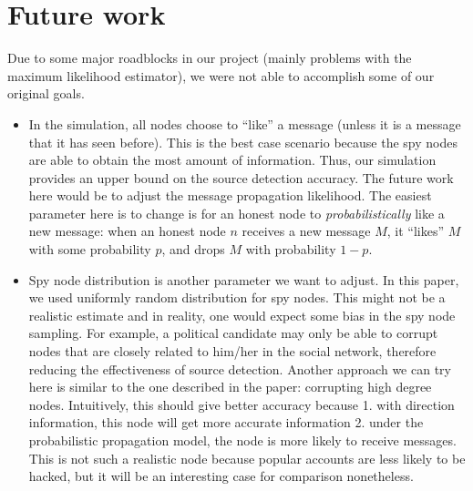 \section{Future work}

Due to some major roadblocks in our project (mainly problems with the maximum likelihood estimator), we were not able to accomplish some of our original goals. 

\begin{itemize}

\item In the simulation, all nodes choose to ``like'' a message (unless it is a message that it has seen before). This is the best case scenario because the spy nodes are able to obtain the most amount of information. Thus, our simulation provides an upper bound on the source detection accuracy. The future work here would be to adjust the message propagation likelihood. The easiest parameter here is to change is for an honest node to \emph{probabilistically} like a new message: when an honest node $n$ receives a new message $M$, it ``likes'' $M$ with some probability $p$, and drops $M$ with probability $1-p$.

\item Spy node distribution is another parameter we want to adjust. In this paper, we used uniformly random distribution for spy nodes. This might not be a realistic estimate and in reality, one would expect some bias in the spy node sampling. For example, a political candidate may only be able to corrupt nodes that are closely related to him/her in the social network, therefore reducing the effectiveness of source detection. Another approach we can try here is similar to the one described in the paper: corrupting high degree nodes. Intuitively, this should give better accuracy because 1. with direction information, this node will get more accurate information 2. under the probabilistic propagation model, the node is more likely to receive messages. This is not such a realistic node because popular accounts are less likely to be hacked, but it will be an interesting case for comparison nonetheless.

\end{itemize}
